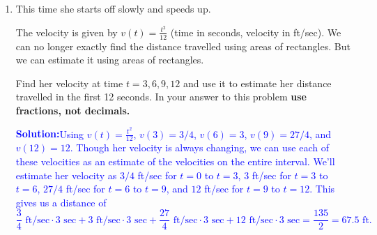 \documentclass[letterpaper,11pt]{article}
\newcommand{\sol}[2]{\begin{minipage}[c][#1]{\linewidth}{\textcolor{blue}{\textbf{Solution:}}\quad \textcolor{blue}{#2}}\end{minipage}}
\newcommand{\sol}[2]{\begin{minipage}[c][#1]{\linewidth}{\vfill}\end{minipage}}
\begin{document}
\begin{enumerate}
How far does she travel this time?

\sol{1 in}{$12 \text{ ft/sec} \cdot 4 \text{ sec}+10 \text{ ft/sec} \cdot 3 \text{ sec} +6 \text{ ft/sec} \cdot 3 \text{ ft/sec}$=$96$ ft.}

\newpage

\item This time she starts off slowly and speeds up. 

\begin{center}
\end{center}

The velocity is given by $v(t)=\frac{t^2}{12}$ (time in seconds, velocity in ft/sec). 
We can no longer exactly find the distance travelled using areas of rectangles. But we can estimate it using areas of rectangles. 

\begin{center}
\end{center}

Find her velocity at time $t=3, 6, 9, 12$ and use it to estimate her distance travelled in the first 12 seconds. 
In your answer to this problem {\bf use fractions, not decimals.}

\sol{2 in}{Using $v(t)=\frac{t^2}{12}$, $v(3)=3/4$, $v(6)=3$, $v(9)=27/4$, and $v(12)=12$. Though her velocity is always changing, we can use each of these velocities as an estimate of the velocities on the entire interval. We'll estimate her velocity as $3/4$ ft/sec for $t=0$ to $t=3$, $3$ ft/sec for $t=3$ to $t=6$, $27/4$ ft/sec for $t=6$ to $t=9$, and $12$ ft/sec for $t=9$ to $t=12$. This gives us a distance of 
\[\frac{3}{4} \text{ ft/sec} \cdot 3 \text{ sec}+3 \text{ ft/sec} \cdot 3 \text{ sec}+\frac{27}{4} \text{ ft/sec} \cdot 3 \text{ sec}+12 \text{ ft/sec} \cdot 3 \text{ sec}=\frac{135}{2}=67.5 \text{ ft.}\]}


\end{enumerate}
\end{document}
